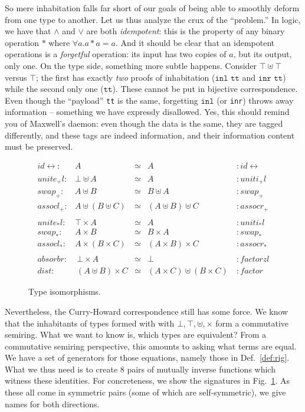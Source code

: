\documentclass{article}
\newcommand{\identlp}{\mathit{unite}_+\mathit{l}}
\newcommand{\identrp}{\mathit{uniti}_+\mathit{l}}
\newcommand{\swapp}{\mathit{swap}_+}
\newcommand{\assoclp}{\mathit{assocl}_+}
\newcommand{\assocrp}{\mathit{assocr}_+}
\newcommand{\identlt}{\mathit{unite}_*\mathit{l}}
\newcommand{\identrt}{\mathit{uniti}_*\mathit{l}}
\newcommand{\swapt}{\mathit{swap}_*}
\newcommand{\assoclt}{\mathit{assocl}_*}
\newcommand{\assocrt}{\mathit{assocr}_*}
\newcommand{\factorzl}{\mathit{factorzl}}
\newcommand{\dist}{\mathit{dist}}
\newcommand{\factor}{\mathit{factor}}
\newcommand{\distz}{\mathit{absorbr}}
\newcommand{\idc}{\mathit{id}\!\!\leftrightarrow}
\begin{document}
So mere inhabitation falls far short of our goals of being able to
smoothly deform from one type to another. Let us thus analyze the crux
of the ``problem.'' In logic, we have that $\land$ and $\lor$ are both
\emph{idempotent}: this is the property of any binary operation $*$
where $\forall a. a * a = a$. And it should be clear that an
idempotent operations is a \emph{forgetful} operation: its input has
two copies of $a$, but its output, only one. On the type side,
something more subtle happens. Consider $\top \uplus \top$
versus $\top$; the first has exactly \emph{two} proofs of inhabitation
($\texttt{inl tt}$ and $\texttt{inr tt}$) while the second only one
($\texttt{tt}$). These cannot be put in bijective correspondence. Even
though the ``payload'' \texttt{tt} is the same, forgetting
$\texttt{inl}$ (or \texttt{inr}) throws away information -- something
we have expressly disallowed.  Yes, this should remind you of
Maxwell's daemon: even though the data is the same, they are tagged
differently, and these tags are indeed information, and their
information content must be preserved.

\begin{figure}[t]
\[
\begin{array}{rrcll}
\idc :& A & \simeq & A &: \idc \\
\\
\identlp :&  \bot \uplus A & \simeq & A &: \identrp \\
\swapp :&  A \uplus B & \simeq & B \uplus A &: \swapp \\
\assoclp :&  A \uplus (B \uplus C) & \simeq & (A \uplus B) \uplus C &: \assocrp \\
\\
\identlt :&  \top \times A & \simeq & A &: \identrt \\
\swapt :&  A \times B & \simeq & B \times A &: \swapt \\
\assoclt :&  A \times (B \times C) & \simeq & (A \times B) \times C &: \assocrt \\
\\
\distz :&~ \bot \times A & \simeq & \bot ~ &: \factorzl \\
\dist :&~ (A \uplus B) \times C & \simeq & (A \times C) \uplus (B \times C)~ &: \factor
\end{array}
\]
\caption{Type isomorphisms.}
\label{type-isos}
\end{figure}

Nevertheless, the Curry-Howard correspondence still has some force. We
know that the inhabitants of types formed with with
$\bot, \top, \uplus, \times$ form a commutative semiring. What we want
to know is, which types are equivalent? From a commutative semiring
perspective, this amounts to asking what terms are equal.  We have a
set of generators for those equations, namely those in
Def.~\ref{def:rig}. What we thus need is to create $8$ pairs of
mutually inverse functions which witness these identities.  For
concreteness, we show the signatures in Fig.~\ref{type-isos}.  As
these all come in symmetric pairs (some of which are self-symmetric),
we give names for both directions.
\end{document}
